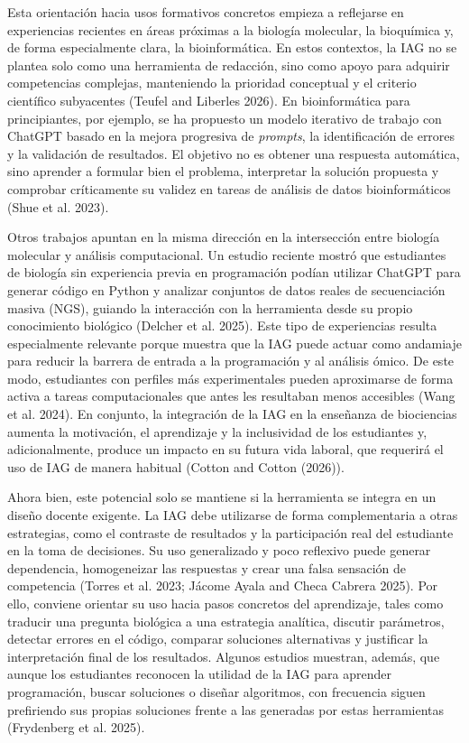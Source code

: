 \documentclass[
  11pt,
  a4paper,
  twoside]{scrreprt}
\begin{document}
Esta orientación hacia usos formativos concretos empieza a reflejarse en
experiencias recientes en áreas próximas a la biología molecular, la
bioquímica y, de forma especialmente clara, la bioinformática. En estos
contextos, la IAG no se plantea solo como una herramienta de redacción,
sino como apoyo para adquirir competencias complejas, manteniendo la
prioridad conceptual y el criterio científico subyacentes (Teufel and
Liberles 2026). En bioinformática para principiantes, por ejemplo, se ha
propuesto un modelo iterativo de trabajo con ChatGPT basado en la mejora
progresiva de \emph{prompts}, la identificación de errores y la
validación de resultados. El objetivo no es obtener una respuesta
automática, sino aprender a formular bien el problema, interpretar la
solución propuesta y comprobar críticamente su validez en tareas de
análisis de datos bioinformáticos (Shue et al. 2023).

Otros trabajos apuntan en la misma dirección en la intersección entre
biología molecular y análisis computacional. Un estudio reciente mostró
que estudiantes de biología sin experiencia previa en programación
podían utilizar ChatGPT para generar código en Python y analizar
conjuntos de datos reales de secuenciación masiva (NGS), guiando la
interacción con la herramienta desde su propio conocimiento biológico
(Delcher et al. 2025). Este tipo de experiencias resulta especialmente
relevante porque muestra que la IAG puede actuar como andamiaje para
reducir la barrera de entrada a la programación y al análisis ómico. De
este modo, estudiantes con perfiles más experimentales pueden
aproximarse de forma activa a tareas computacionales que antes les
resultaban menos accesibles (Wang et al. 2024). En conjunto, la
integración de la IAG en la enseñanza de biociencias aumenta la
motivación, el aprendizaje y la inclusividad de los estudiantes y,
adicionalmente, produce un impacto en su futura vida laboral, que
requerirá el uso de IAG de manera habitual (Cotton and Cotton (2026)).

Ahora bien, este potencial solo se mantiene si la herramienta se integra
en un diseño docente exigente. La IAG debe utilizarse de forma
complementaria a otras estrategias, como el contraste de resultados y la
participación real del estudiante en la toma de decisiones. Su uso
generalizado y poco reflexivo puede generar dependencia, homogeneizar
las respuestas y crear una falsa sensación de competencia (Torres et al.
2023; Jácome Ayala and Checa Cabrera 2025). Por ello, conviene orientar
su uso hacia pasos concretos del aprendizaje, tales como traducir una
pregunta biológica a una estrategia analítica, discutir parámetros,
detectar errores en el código, comparar soluciones alternativas y
justificar la interpretación final de los resultados. Algunos estudios
muestran, además, que aunque los estudiantes reconocen la utilidad de la
IAG para aprender programación, buscar soluciones o diseñar algoritmos,
con frecuencia siguen prefiriendo sus propias soluciones frente a las
generadas por estas herramientas (Frydenberg et al. 2025).
\end{document}
